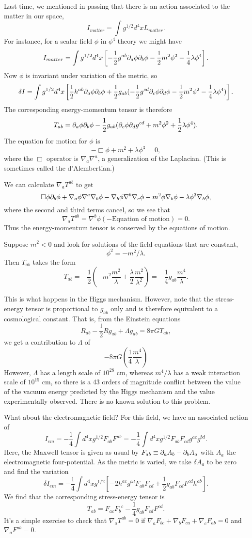 Last time, we mentioned in passing that there is an action associated to the matter in our space,
$$I_{matter}=\int g^{1/2} d^4x L_{matter}.$$
For instance, for a scalar field $\phi$ in $\phi^4$ theory we might have
$$I_{matter}=\int g^{1/2} d^4x \left[-\frac{1}{2}g^{ab}\partial_a \phi \partial_b \phi -\frac{1}{2}m^2\phi^2-\frac{1}{4} \lambda \phi^4\right].$$
Now $\phi$ is invariant under variation of the metric, so
$$\delta I =\int g^{1/2} d^4x \left[\frac{1}{2} h^{ab}\partial_a \phi \partial_b \phi +\frac{1}{2} g_{ab}(-\frac{1}{2} g^{cd} \partial_c \phi \partial_d \phi -\frac{1}{2} m^2 \phi^2 -\frac{1}{4} \lambda \phi^4)\right].$$
The corresponding energy-momentum tensor is therefore
$$T_{ab}=\partial_a \phi \partial_b \phi -\frac{1}{2} g_{ab}(\partial_c \phi \partial_d g^{cd} +m^2\phi^2 +\frac{1}{2} \lambda \phi^4).$$
The equation for motion for $\phi$ is
$$-\Box \phi+ m^2 +\lambda \phi^3 =0,$$
where the $\Box$ operator is $\nabla_a \nabla^a$, a generalization of the Laplacian. (This is sometimes called the d'Alembertian.)

We can calculate $\nabla_a T^{ab}$ to get
$$\Box \phi \partial_b \phi + \nabla_a \phi \nabla^a \nabla_b \phi - \nabla_b \phi \nabla^b \nabla_c \phi - m^2 \phi \nabla_b \phi - \lambda \phi^3 \nabla_b \phi,$$
where the second and third terms cancel,%
so we see that
$$\nabla_a T^{ab}=\nabla^b \phi(-\text{Equation of motion})=0.$$
Thus the energy-momentum tensor is conserved by the equations of motion.

Suppose $m^2 <0$ and look for solutions of the field equations that are constant,
$$\phi^2 = -m^2/\lambda.$$ Then $T_{ab}$ takes the form
$$T_{ab}=-\frac{1}{2}(-m^2 \frac{m^2}{\lambda}+\frac{\lambda}{2} \frac{m^2}{\lambda^2})= -\frac{1}{4}g_{ab} \frac{m^4}{\lambda}.$$

This is what happens in the Higgs mechanism. However, note that the stress-energy tensor is proportional to $g_{ab}$ only and is therefore equivalent to a cosmological constant. That is, from the Einstein equations
$$R_{ab}-\frac{1}{2}R g_{ab} +\Lambda g_{ab} = 8\pi G T_{ab},$$ 
we get a contribution to $\Lambda$ of
$$-8\pi G \left(\frac{1}{4} \frac{m^4}{\lambda}\right)$$ However, $\Lambda$ has a length scale of $10^{28}$ cm, whereas $m^4/\lambda$ has a weak interaction scale of $10^{15}$ cm, so there is a 43 orders of magnitude conflict between the value of the vacuum energy predicted by the Higgs mechanism and the value experimentally observed. There is no known solution to this problem.

What about the electromagnetic field? For this field, we have an associated action of
$$I_{em}=-\frac{1}{4}\int d^4x g^{1/2} F_{ab} F^{ab} = -\frac{1}{4}\int d^4x g^{1/2} F_{ab} F_{cd} g^{ac} g^{bd}.$$
Here, the Maxwell tensor is given as usual by $F_{ab}\equiv \partial_a A_b -\partial_b A_a$ with $A_a$ the electromagnetic four-potential. As the metric is varied, we take $\delta A_a$ to be zero and find the variation
$$\delta I_{em}=-\frac{1}{4} \int d^4x g^{1/2} [-2 h^{ac} g^{bd} F_{ab} F_{cd} + \frac{1}{2} g_{ab} F_{cd} F^{cd} h^{ab}].$$
We find that the corresponding stress-energy tensor is
$$T_{ab}=F_{ac} {F_b}^c - \frac{1}{4} g_{ab} F_{cd} F^{cd}.$$
It's a simple exercise to check that $\nabla_a T^{ab}=0$ if $\nabla_a F_{bc} + \nabla_b F_{ca} + \nabla_c F_{ab}=0$ and $\nabla_a F^{ab}=0$.

